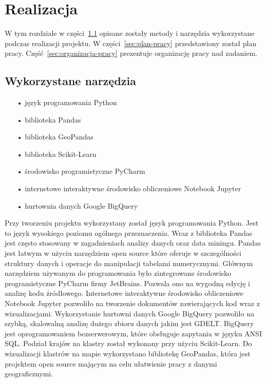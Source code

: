 \documentclass[11pt]{report}
\begin{document}
    \chapter{Realizacja}\label{ch:realizacja}

    W tym rozdziale w części~\ref{sec:wykorzystane-narzędzia} opisane zostały metody i narzędzia wykorzystane podczas realizacji projektu.
    W części~\ref{sec:plan-pracy} przedstawiony został plan pracy.
    Część~\ref{sec:organizacja-pracy} prezentuje organizację pracy nad zadaniem.


    \section{Wykorzystane narzędzia}\label{sec:wykorzystane-narzędzia}

    \begin{enumerate}
        \item[•] język programowania Python~\cite{python}
        \item[•] biblioteka Pandas~\cite{pandas}
        \item[•] biblioteka GeoPandas~\cite{geopandas}
        \item[•] biblioteka Scikit-Learn~\cite{scikit}
        \item[•] środowisko programistyczne PyCharm~\cite{pycharm}
        \item[•] internetowe interaktywne środowisko obliczeniowe Notebook Jupyter~\cite{jupyter}
        \item[•] hurtownia danych Google BigQuery~\cite{bigquery}
    \end{enumerate}

    Przy tworzeniu projektu wykorzystany został język programowania Python.
    Jest to język wysokiego poziomu ogólnego przeznaczenia.
    Wraz z biblioteka Pandas jest często stosowany w zagadnieniach analizy danych oraz data miningu.
    Pandas jest łatwym w użyciu narzędziem open source które oferuje w szczególności struktury danych i operacje do manipulacji tabelami numerycznymi.
    Głównym narzędziem używanym do programowania było zintegrowane środowisko programistyczne PyCharm firmy JetBrains.
    Pozwala ono na wygodną edycję i analizę kodu źródłowego.
    Internetowe interaktywne środowisko obliczeniowe Notebook Jupyter pozwoliło na tworzenie dokumentów zawierających kod wraz z wizualizacjami.
    Wykorzystanie hurtowni danych Google BigQuery pozwoliło na szybką, skalowalną analizę dużego zbioru danych jakim jest GDELT.
    BigQuery jest oprogramowaniem bezserwerowym, które obsługuje zapytania w języku ANSI SQL.
    Podział krajów na klastry został wykonany przy użyciu Scikit-Learn.
    Do wizualizacji klastrów na mapie wykorzystano bibliotekę GeoPandas, która jest projektem open source mającym na celu ułatwienie pracy z danymi geograficznymi.
\end{document}

